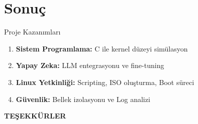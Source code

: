 \documentclass[aspectratio=169]{beamer}
\begin{document}
\section{Sonuç}
\begin{frame}{Proje Kazanımları}
    \begin{enumerate}
        \item \textbf{Sistem Programlama:} C ile kernel düzeyi simülasyon
        \item \textbf{Yapay Zeka:} LLM entegrasyonu ve fine-tuning
        \item \textbf{Linux Yetkinliği:} Scripting, ISO oluşturma, Boot süreci
        \item \textbf{Güvenlik:} Bellek izolasyonu ve Log analizi
    \end{enumerate}
    
    \vspace{1cm}
    \centering
    \Large \textbf{TEŞEKKÜRLER}
\end{frame}
\end{document}
